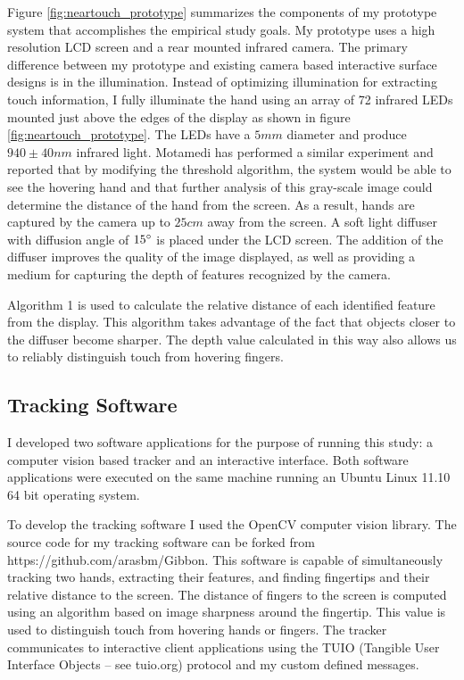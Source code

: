 Figure \ref{fig:neartouch_prototype} summarizes the components of my prototype system that accomplishes the empirical study goals.  
My prototype uses a high resolution LCD screen and a rear mounted infrared camera.
The primary difference between my prototype and existing camera based interactive surface designs is in the illumination.
Instead of optimizing illumination for extracting touch information, I fully illuminate the hand using an array of 72 infrared LEDs mounted just above the edges of the display as shown in figure \ref{fig:neartouch_prototype}. 
The LEDs have a $5mm$ diameter and produce $940 \pm 40 nm$ infrared light.
Motamedi \cite{motamedi:2008:HTMOSHDTV} has performed a similar experiment and
reported that by modifying the threshold algorithm, the system would be able to
see the hovering hand and that further analysis of this gray-scale image could
determine the distance of the hand from the screen.
As a result, hands are captured by the camera up to $25cm$ away from the screen.
A soft light diffuser with diffusion angle of $15\degree$ is placed under the LCD screen.
The addition of the diffuser improves the quality of the image displayed, as well as providing a medium for capturing the depth of features recognized by the camera.

Algorithm 1 is used to calculate the relative distance of each identified feature from the display.
This algorithm takes advantage of the fact that objects closer to the diffuser become sharper.
The depth value calculated in this way also allows us to reliably distinguish touch from hovering fingers.

\subsection{Tracking Software}
I developed two software applications for the purpose of running this study: a computer vision based tracker and an interactive interface.
Both software applications were executed on the same machine running an Ubuntu Linux 11.10 64 bit operating system.

To develop the tracking software I used the OpenCV computer vision library.
The source code for my tracking software can be forked from https://github.com/arasbm/Gibbon.
This software is capable of simultaneously tracking two hands, extracting their features, and finding fingertips and their relative distance to the screen. 
The distance of fingers to the screen is computed using an algorithm based on image sharpness around the fingertip. 
This value is used to distinguish touch from hovering hands or fingers.
The tracker communicates to interactive client applications using the TUIO (Tangible User Interface Objects -- see tuio.org) protocol and my custom defined messages.

